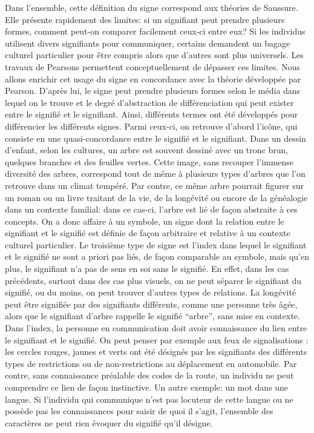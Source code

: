 Dans l'ensemble, cette définition du signe correspond aux théories de Saussure.
Elle présente rapidement des limites: si un signifiant peut prendre plusieurs formes, comment peut-on comparer facilement ceux-ci entre eux? 
Si les individus utilisent divers signifiants pour communiquer, certains demandent un bagage culturel particulier pour être compris alors que d'autres sont plus universels.
Les travaux de Pearsons permettent conceptuellement de dépasser ces limites.
Nous allons enrichir cet usage du signe en concordance avec la théorie développée par Pearson. 
D'après lui, le signe peut prendre plusieurs formes selon le média dans lequel on le trouve et le degré d'abstraction de différenciation qui peut exister entre le signifié et le signifiant. 
Ainsi, différents termes ont été développés pour différencier les différents signes.
Parmi ceux-ci, on retrouve d'abord l'icône, qui consiste en une quasi-concordance entre le signifié et le signifiant. 
Dans un dessin d'enfant, selon les cultures, un arbre est souvent dessiné avec un tronc brun, quelques branches et des feuilles vertes. 
Cette image, sans recouper l'immense diversité des arbres, correspond tout de même à plusieurs types d'arbres que l'on retrouve dans un climat tempéré. 
Par contre, ce même arbre pourrait figurer sur un roman ou un livre traitant de la vie, de la longévité ou encore de la généalogie dans un contexte familial: dans ce cas-ci, l'arbre est lié de façon abstraite à ces concepts. 
On a donc affaire à un symbole, un signe dont la relation entre le signifiant et le signifié est définie de façon arbitraire et relative à un contexte culturel particulier. 
Le troisième type de signe est l'index dans lequel le signifiant et le signifié ne sont a priori pas liés, de façon comparable au symbole, mais qu'en plus, le signifiant n'a pas de sens en soi sans le signifié. 
En effet, dans les cas précédents, surtout dans des cas plus visuels, on ne peut séparer le signifiant du signifié, ou du moins, on peut trouver d'autres types de relations. 
La longévité peut être signifiée par des signifiants différents, comme une personne très âgée, alors que le signifiant d'arbre rappelle le signifié \enquote{arbre}, sans mise en contexte. 
Dans l'index, la personne en communication doit avoir connaissance du lien entre le signifiant et le signifié. 
On peut penser par exemple aux feux de signalisations : les cercles rouges, jaunes et verts ont été désignés par les signifiants des différents types de restrictions ou de non-restrictions au déplacement en automobile. 
Par contre, sans connaissance préalable des codes de la route, un individu ne peut comprendre ce lien de façon instinctive. 
Un autre exemple: un mot dans une langue. 
Si l'individu qui communique n'est pas locuteur de cette langue ou ne possède pas les connaissances pour saisir de quoi il s'agit, l'ensemble des caractères ne peut rien évoquer du signifié qu'il désigne.

